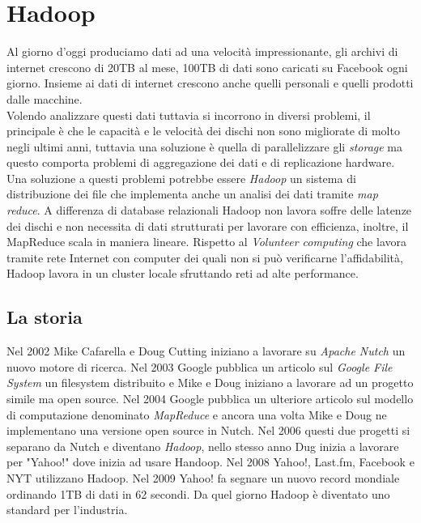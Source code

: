 \section{Hadoop}\label{capitolo7}
Al giorno d'oggi produciamo dati ad una velocità impressionante, gli archivi di internet crescono di 20TB al mese, 100TB di dati sono caricati su Facebook ogni giorno. Insieme ai dati di internet crescono anche quelli personali e quelli prodotti dalle macchine.\\
Volendo analizzare questi dati tuttavia si incorrono in diversi problemi, il principale è che le capacità e le velocità dei dischi non sono migliorate di molto negli ultimi anni, tuttavia una soluzione è quella di parallelizzare gli \emph{storage} ma questo comporta problemi di aggregazione dei dati e di replicazione hardware.
Una soluzione a questi problemi potrebbe essere \emph{Hadoop} un sistema di distribuzione dei file che implementa anche un analisi dei dati tramite \emph{map reduce}. A differenza di database relazionali Hadoop non lavora soffre delle latenze dei dischi e non necessita di dati strutturati per lavorare con efficienza, inoltre, il MapReduce scala in maniera lineare. Rispetto al \emph{Volunteer computing} che lavora tramite rete Internet con computer dei quali non si può verificarne l'affidabilità, Hadoop lavora in un cluster locale sfruttando reti ad alte performance.\\
\subsection{La storia}
Nel 2002 Mike Cafarella e Doug Cutting iniziano a lavorare su \emph{Apache Nutch} un nuovo motore di ricerca. Nel 2003 Google pubblica un articolo sul \emph{Google File System} un filesystem distribuito e Mike e Doug iniziano a lavorare ad un progetto simile ma open source. Nel 2004 Google pubblica un ulteriore articolo sul modello di computazione denominato \emph{MapReduce} e ancora una volta Mike e Doug ne implementano una versione open source in Nutch. Nel 2006 questi due progetti si separano da Nutch e diventano \emph{Hadoop}, nello stesso anno Dug inizia a lavorare per "Yahoo!" dove inizia ad usare Handoop. Nel 2008 Yahoo!, Last.fm, Facebook e NYT utilizzano Hadoop. Nel 2009 Yahoo! fa segnare un nuovo record mondiale ordinando 1TB di dati in 62 secondi. Da quel giorno Hadoop è diventato uno standard per l'industria.\\
